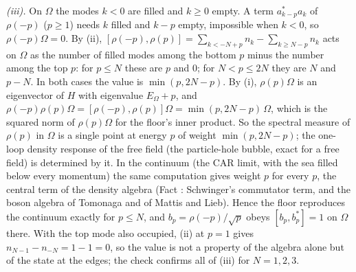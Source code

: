 \emph{(iii).} On $\Omega$ the modes $k < 0$ are filled and $k \ge 0$ empty. A term $a_{k-p}^{*}a_k$ of $\rho(-p)$ ($p \ge 1$) needs $k$ filled and $k - p$ empty, impossible when $k < 0$, so $\rho(-p)\Omega = 0$. By (ii), $[\rho(-p), \rho(p)] = \sum_{k < -N + p} n_k - \sum_{k \ge N - p} n_k$ acts on $\Omega$ as the number of filled modes among the bottom $p$ minus the number among the top $p$: for $p \le N$ these are $p$ and $0$; for $N < p \le 2N$ they are $N$ and $p - N$. In both cases the value is $\min(p, 2N - p)$. By (i), $\rho(p)\Omega$ is an eigenvector of $H$ with eigenvalue $E_\Omega + p$, and $\rho(-p)\rho(p)\Omega = [\rho(-p), \rho(p)]\Omega = \min(p, 2N - p)\,\Omega$, which is the squared norm of $\rho(p)\Omega$ for the floor's inner product. So the spectral measure of $\rho(p)$ in $\Omega$ is a single point at energy $p$ of weight $\min(p, 2N - p)$; the one-loop density response of the free field (the particle-hole bubble, exact for a free field) is determined by it. In the continuum (the CAR limit, with the sea filled below every momentum) the same computation gives weight $p$ for every $p$, the central term of the density algebra (Fact : Schwinger's commutator term, and the boson algebra of Tomonaga and of Mattis and Lieb). Hence the floor reproduces the continuum exactly for $p \le N$, and $b_p = \rho(-p)/\sqrt{p}$ obeys $[b_p, b_p^{*}] = 1$ on $\Omega$ there. With the top mode also occupied, (ii) at $p = 1$ gives $n_{N-1} - n_{-N} = 1 - 1 = 0$, so the value is not a property of the algebra alone but of the state at the edges; the check confirms all of (iii) for $N = 1, 2, 3$.


